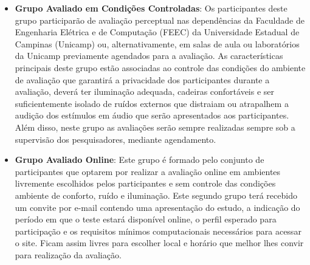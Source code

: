\documentclass[a4paper,11pt,titlepage,singlespacing]{article}
\begin{document}
\begin{itemize}
    \item \textbf{Grupo Avaliado em Condições Controladas}: Os participantes deste grupo participarão de avaliação perceptual nas dependências da Faculdade de Engenharia Elétrica e de Computação (FEEC) da Universidade Estadual de Campinas (Unicamp) ou, alternativamente, em salas de aula ou laboratórios da Unicamp previamente agendados para a avaliação. As características principais deste grupo estão associadas ao controle das condições do ambiente de avaliação que garantirá a privacidade dos participantes durante a avaliação, deverá ter iluminação adequada, cadeiras confortáveis e ser suficientemente isolado de ruídos externos que distraiam ou atrapalhem a audição dos estímulos em áudio que serão apresentados aos participantes. Além disso, neste grupo as avaliações serão sempre realizadas sempre sob a supervisão dos pesquisadores, mediante agendamento. 
    \item \textbf{Grupo Avaliado Online}: Este grupo é formado pelo conjunto de participantes que optarem por realizar a avaliação online em ambientes livremente escolhidos pelos participantes e sem controle das condições ambiente de conforto, ruído e iluminação. Este segundo grupo terá recebido um convite por e-mail contendo uma apresentação do estudo, a indicação do período em que o teste estará disponível online, o perfil esperado para participação e os requisitos mínimos computacionais necessários para acessar o site. Ficam assim livres para escolher local e horário que melhor lhes convir para realização da avaliação.
\end{itemize}



\end{document}
